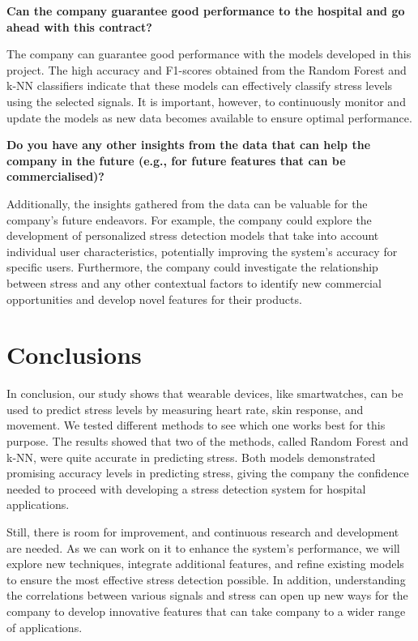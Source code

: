\documentclass{article}
\begin{document}
\bigbreak

\noindent\textbf{Can the company guarantee good performance to the hospital
and go ahead with this contract?}

\noindent The company can guarantee good performance with the models developed in this project. The high accuracy and F1-scores obtained from the Random Forest and k-NN classifiers indicate that these models can effectively classify stress levels using the selected signals. It is important, however, to continuously monitor and update the models as new data becomes available to ensure optimal performance.

\bigbreak

\noindent\textbf{Do you have any other insights from the data that can help the company in the future (e.g.,
for future features that can be commercialised)?}

\noindent
Additionally, the insights gathered from the data can be valuable for the company's future endeavors. For example, the company could explore the development of personalized stress detection models that take into account individual user characteristics, potentially improving the system's accuracy for specific users. Furthermore, the company could investigate the relationship between stress and any other contextual factors to identify new commercial opportunities and develop novel features for their products.

\section{Conclusions}
In conclusion, our study shows that wearable devices, like smartwatches, can be used to predict stress levels by measuring heart rate, skin response, and movement. We tested different methods to see which one works best for this purpose. The results showed that two of the methods, called Random Forest and k-NN, were quite accurate in predicting stress. Both models demonstrated promising accuracy levels in predicting stress, giving the company the confidence needed to proceed with developing a stress detection system for hospital applications.

Still, there is room for improvement, and continuous research and development are needed. As we can work on it to enhance the system's performance, we will explore new techniques, integrate additional features, and refine existing models to ensure the most effective stress detection possible. In addition, understanding the correlations between various signals and stress can open up new ways for the company to develop innovative features that can take company to a wider range of applications.
\end{document}
